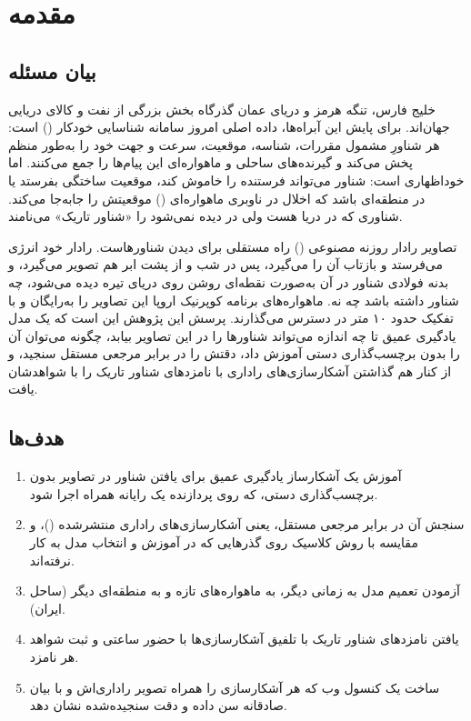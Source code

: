 \chapter{مقدمه}
\label{ch:intro}

\section{بیان مسئله}
خلیج فارس، تنگه هرمز و دریای عمان گذرگاه بخش بزرگی از نفت و کالای دریایی جهان‌اند. برای
پایش این آبراه‌ها، داده اصلی امروز سامانه شناسایی خودکار () است: هر شناورِ مشمول
مقررات، شناسه، موقعیت، سرعت و جهت خود را به‌طور منظم پخش می‌کند و گیرنده‌های ساحلی و
ماهواره‌ای این پیام‌ها را جمع می‌کنند. اما  خوداظهاری است: شناور می‌تواند فرستنده را
خاموش کند، موقعیت ساختگی بفرستد یا در منطقه‌ای باشد که اخلال در ناوبری ماهواره‌ای
() موقعیتش را جابه‌جا می‌کند. شناوری که در دریا هست ولی در  دیده نمی‌شود را
«شناور تاریک» می‌نامند.

تصاویر رادار روزنه مصنوعی () راه مستقلی برای دیدن شناورهاست. رادار خود انرژی
می‌فرستد و بازتاب آن را می‌گیرد، پس در شب و از پشت ابر هم تصویر می‌گیرد، و بدنه فولادی
شناور در آن به‌صورت نقطه‌ای روشن روی دریای تیره دیده می‌شود، چه شناور  داشته باشد چه
نه. ماهواره‌های  برنامه کوپرنیک اروپا این تصاویر را به‌رایگان و با تفکیک حدود
۱۰ متر در دسترس می‌گذارند. پرسش این پژوهش این است که یک مدل یادگیری عمیق تا چه اندازه
می‌تواند شناورها را در این تصاویر بیابد، چگونه می‌توان آن را بدون برچسب‌گذاری دستی آموزش
داد، دقتش را در برابر مرجعی مستقل سنجید، و از کنار هم گذاشتن آشکارسازی‌های راداری با
 نامزدهای شناور تاریک را با شواهدشان یافت.

\section{هدف‌ها}
\begin{enumerate}
\item آموزش یک آشکارساز یادگیری عمیق برای یافتن شناور در تصاویر  بدون
برچسب‌گذاری دستی، که روی پردازنده یک رایانه همراه اجرا شود.
\item سنجش آن در برابر مرجعی مستقل، یعنی آشکارسازی‌های راداری منتشرشده
 ()، و مقایسه با روش کلاسیک  روی گذرهایی که در
آموزش و انتخاب مدل به کار نرفته‌اند.
\item آزمودن تعمیم مدل به زمانی دیگر، به ماهواره‌های تازه  و به منطقه‌ای
دیگر (ساحل ایران).
\item یافتن نامزدهای شناور تاریک با تلفیق آشکارسازی‌ها با حضور ساعتی  و ثبت شواهد
هر نامزد.
\item ساخت یک کنسول وب که هر آشکارسازی را همراه تصویر راداری‌اش و با بیان صادقانه سن داده و
دقت سنجیده‌شده نشان دهد.
\end{enumerate}

